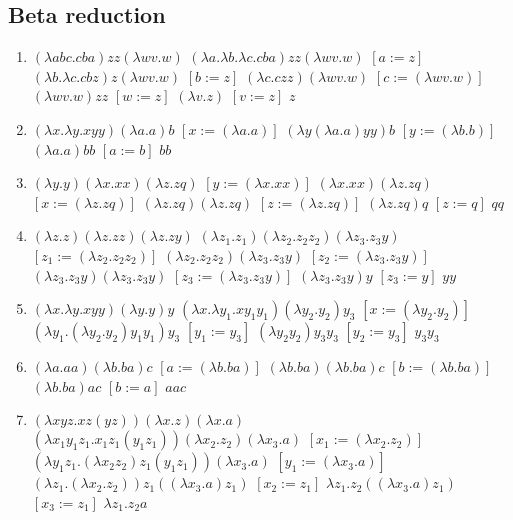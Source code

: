 \documentclass[11pt]{article}
\begin{document}
\subsection{Beta reduction}
\label{sec:orge674a9d}
\begin{enumerate}
\item \(({\lambda}abc.cba) zz ({\lambda}wv.w)\)
\(({\lambda}a.{\lambda}b.{\lambda}c.cba) zz ({\lambda}wv.w)\)
\([a := z]\)
\(({\lambda}b.{\lambda}c.cbz) z ({\lambda}wv.w)\)
\([b := z]\)
\(({\lambda}c.czz) ({\lambda}wv.w)\)
\([c := ({\lambda}wv.w)]\)
\(({\lambda}wv.w) z z\)
\([ w := z]\)
\(({\lambda}v.z)\)
\([ v := z ]\)
\(z\)
\item \(({\lambda}x.{\lambda}y.xyy)({\lambda}a.a)b\)
\([x := ({\lambda}a.a)]\)
\(({\lambda}y({\lambda}a.a)yy)b\)
\([ y := ({\lambda}b.b)]\)
\(({\lambda}a.a)bb\)
\([ a := b ]\)
\(bb\)
\item \(({\lambda}y.y)({\lambda}x.xx)({\lambda}z.zq)\)
\([y := ({\lambda}x.xx)]\)
\(({\lambda}x.xx)({\lambda}z.zq)\)
\([x := ({\lambda}z.zq)]\)
\(({\lambda}z.zq)({\lambda}z.zq)\)
\([z := ({\lambda}z.zq)]\)
\(({\lambda}z.zq)q\)
\([ z := q ]\)
\(qq\)
\item \(({\lambda}z.z)({\lambda}z.zz)({\lambda}z.zy)\)
\(({\lambda}z_1.z_1)({\lambda}z_2.z_2z_2)({\lambda}z_3.z_3y)\)
\([z_1 := ({\lambda}z_2.z_2z_2)]\)
\(({\lambda}z_2.z_2z_2)({\lambda}z_3.z_3y)\)
\([z_2 := ({\lambda}z_3.z_3y)]\)
\(({\lambda}z_3.z_3y)({\lambda}z_3.z_3y)\)
\([z_3 := ({\lambda}z_3.z_3y)]\)
\(({\lambda}z_3.z_3y)y\)
\([ z_3 := y ]\)
\(yy\)
\item \(({\lambda}x.{\lambda}y.xyy)({\lambda}y.y)y\)
\(({\lambda}x.{\lambda}y_1.xy_1y_1)({\lambda}y_2.y_2)y_3\)
\([x := ({\lambda}y_2.y_2)]\)
\(({\lambda}y_1.({\lambda}y_2.y_2)y_1y_1)y_3\)
\([ y_1 := y_3 ]\)
\(({\lambda}y_2y_2)y_3y_3\)
\([y_2 := y_3]\)
\(y_3y_3\)
\item \(({\lambda}a.aa)({\lambda}b.ba)c\)
\([a := ({\lambda}b.ba)]\)
\(({\lambda}b.ba)({\lambda}b.ba)c\)
\([b := ({\lambda}b.ba)]\)
\(({\lambda}b.ba)ac\)
\([b := a]\)
\(aac\)
\item \(({\lambda}xyz.xz(yz))({\lambda}x.z)({\lambda}x.a)\)
\(({\lambda}x_1y_1z_1.x_1z_1(y_1z_1)) ({\lambda}x_2.z_2) ({\lambda}x_3.a)\)
\([x_1 := ({\lambda}x_2.z_2)]\)
\(({\lambda}y_1z_1.({\lambda}x_2z_2)z_1(y_1z_1)) ({\lambda}x_3.a)\)
\([y_1 := ({\lambda}x_3.a)]\)
\(({\lambda}z_1.({\lambda}x_2.z_2)) z_1 (({\lambda}x_3.a)z_1)\)
\([x_2 := z_1]\)
\({\lambda}z_1.z_2(({\lambda}x_3.a)z_1)\)
\([x_3 := z_1]\)
\({\lambda}z_1.z_2a\)
\end{enumerate}
\end{document}
